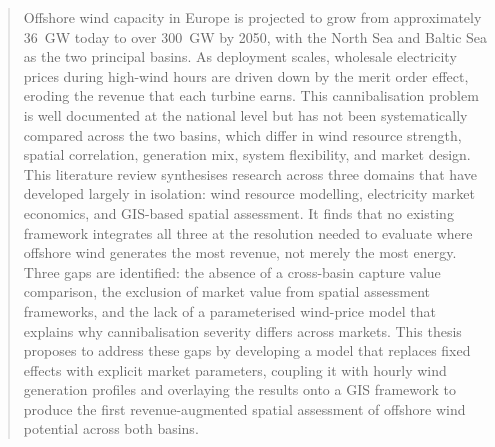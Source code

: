 \documentclass[letterpaper, 11pt]{article}%
\begin{document}
\pagestyle{fancy}
\fancyhf{}

\fancyhead[R]{\small \rm \textbf{\thepage}} %


\renewcommand{\sectionmark}[1]{\markright{\thesection.\ #1}}
\renewcommand{\headrulewidth}{0.5pt}
\renewcommand{\footrulewidth}{0.5pt}
\setlength{\headheight}{30pt}



\tableofcontents
\thispagestyle{empty}
\newpage

\begin{abstract}
\noindent
Offshore wind capacity in Europe is projected to grow from approximately 36~GW today to over 300~GW by 2050, with the North Sea and Baltic Sea as the two principal basins. As deployment scales, wholesale electricity prices during high-wind hours are driven down by the merit order effect, eroding the revenue that each turbine earns. This cannibalisation problem is well documented at the national level but has not been systematically compared across the two basins, which differ in wind resource strength, spatial correlation, generation mix, system flexibility, and market design. This literature review synthesises research across three domains that have developed largely in isolation: wind resource modelling, electricity market economics, and GIS-based spatial assessment. It finds that no existing framework integrates all three at the resolution needed to evaluate where offshore wind generates the most revenue, not merely the most energy. Three gaps are identified: the absence of a cross-basin capture value comparison, the exclusion of market value from spatial assessment frameworks, and the lack of a parameterised wind-price model that explains why cannibalisation severity differs across markets. This thesis proposes to address these gaps by developing a model that replaces fixed effects with explicit market parameters, coupling it with hourly wind generation profiles and overlaying the results onto a GIS framework to produce the first revenue-augmented spatial assessment of offshore wind potential across both basins.
\end{abstract}
\thispagestyle{empty}
\newpage
\end{document}
